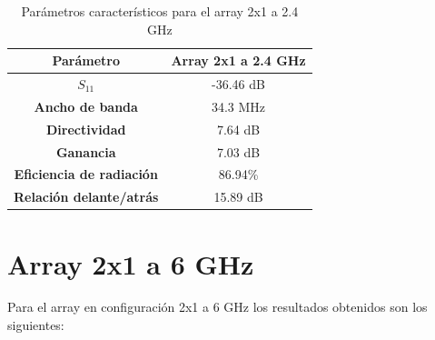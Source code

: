 \begin{table}[H]
  
   
   \small %
   \centering %
   \begin{tabular}{c c} %
   \toprule[\heavyrulewidth]\toprule[\heavyrulewidth]
   \textbf{Parámetro} & \textbf{Array 2x1 a 2.4 GHz} \\ 
   \midrule
   \textbf{$S_{11}$} & -36.46 dB \\
   \textbf{Ancho de banda} & 34.3 MHz \\
   \textbf{Directividad} & 7.64 dB \\
   \textbf{Ganancia} & 7.03 dB \\
   \textbf{Eficiencia de radiación} & 86.94\% \\
   \textbf{Relación delante/atrás} & 15.89 dB \\

   \bottomrule[\heavyrulewidth] 
   \end{tabular}
  
   \caption{Parámetros característicos para el array 2x1 a 2.4 GHz} 
    \label{tab:res2x11}
\end{table}













\section{Array 2x1 a 6 GHz}
\par Para el array en configuración 2x1 a 6 GHz los resultados obtenidos son los siguientes:

